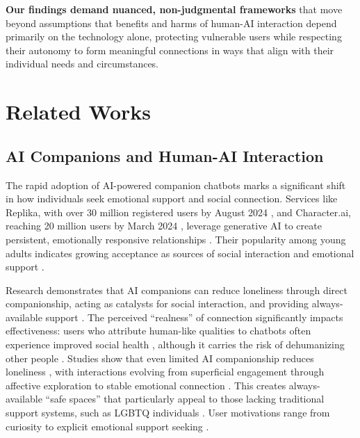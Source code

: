 \documentclass[sigconf, nonacm]{acmart}
\begin{document}
\textbf{Our findings demand nuanced, non-judgmental frameworks} that move beyond assumptions that benefits and harms of human-AI interaction depend primarily on the technology alone, protecting vulnerable users while respecting their autonomy to form meaningful connections in ways that align with their individual needs and circumstances.


\section{Related Works}
\subsection{AI Companions and Human-AI Interaction
}
The rapid adoption of AI-powered companion chatbots marks a significant shift in how individuals seek emotional support and social connection. Services like Replika, with over 30 million registered users by August 2024 \cite{Patel2024-wq, Siemon2022-lt}, and Character.ai, reaching 20 million users by March 2024 \cite{Shewale2024-sm}, leverage generative AI to create persistent, emotionally responsive relationships \cite{Wang2024-ca, Goodings2024-qa, Boine2023-xx, Chen2024-jp, Shani2022-xl, Brewer2022-tj}. Their popularity among young adults indicates growing acceptance as sources of social interaction and emotional support \cite{Koulouri2022-ct, Xygkou2024-dt, Xygkou2023-ql}.

Research demonstrates that AI companions can reduce loneliness through direct companionship, acting as catalysts for social interaction, and providing always-available support \cite{Gasteiger2021-bq, Ta2020-fu}. The perceived ``realness'' of connection significantly impacts effectiveness: users who attribute human-like qualities to chatbots often experience improved social health \cite{Xia2024-mv}, although it carries the risk of dehumanizing other people \cite{Zehnder2021-vf}. Studies show that even limited AI companionship reduces loneliness \cite{De-Freitas2024-hn}, with interactions evolving from superficial engagement through affective exploration to stable emotional connection \cite{Skjuve2021-uf}. This creates always-available ``safe spaces'' \cite{Ta2020-fu} that particularly appeal to those lacking traditional support systems, such as LGBTQ individuals \cite{Ma2024-ll}. User motivations range from curiosity to explicit emotional support seeking \cite{Ta-Johnson2022-xw}.
\end{document}

